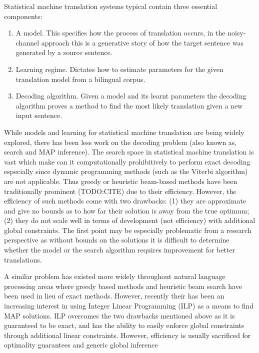Statistical machine translation systems typical contain three
essential components:
\begin{enumerate}
\item A model.  This specifies how the process of translation occurs,
  in the noisy-channel approach this is a generative story of how the
  target sentence was generated by a source sentence.
\item Learning regime.  Dictates how to estimate parameters for the
  given translation model from a bilingual corpus.
\item Decoding algorithm.  Given a model and its learnt parameters the
  decoding algorithm proves a method to find the most likely
  translation given a new input sentence.
\end{enumerate}

While models and learning for statistical machine translation are
being widely explored, there has been less work on the decoding
problem (also known as, search and MAP inference).  The search space
in statistical machine translation is vast which make can it
computationally prohibitively to perform exact decoding especially
since dynamic programming methods (such as the Viterbi algorithm) are
not applicable.  Thus greedy or heuristic beam-based methods have been
traditionally prominent (TODO:CITE) due to their efficiency.  However,
the efficiency of such methods come with two drawbacks: (1) they are
approximate and give no bounds as to how far their solution is away
from the true optimum; (2) they do not scale well in terms of
development (not efficiency) with additional global constraints.  The
first point may be especially problematic from a research perspective
as without bounds on the solutions it is difficult to determine
whether the model or the search algorithm requires improvement for
better translations.

A similar problem has existed more widely throughout natural language
processing areas where greedy based methods and heuristic beam search
have been used in lieu of exact methods.  However, recently their has
been an increasing interest in using Integer Linear Programming (ILP)
as a means to find MAP solutions.  ILP overcomes the two drawbacks
mentioned above as it is guaranteed to be exact, and has the ability
to easily enforce global constraints through additional linear
constraints.  However, efficiency is usually sacrificed for optimality
guarantees and generic global inference

